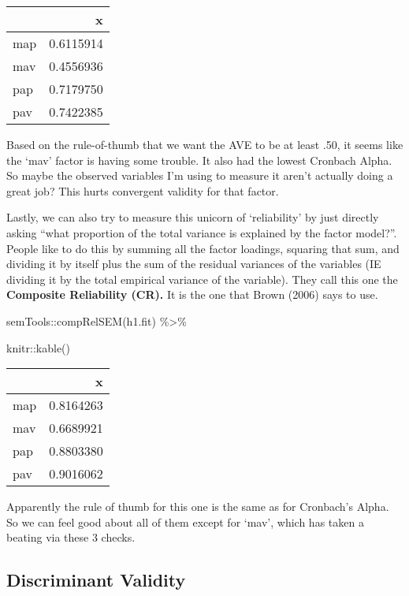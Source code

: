 \documentclass[
  letterpaper,
  DIV=11,
  numbers=noendperiod]{scrreprt}
\newenvironment{Shaded}{\begin{snugshade}}{\end{snugshade}}
\newcommand{\FunctionTok}[1]{\textcolor[rgb]{0.28,0.35,0.67}{#1}}
\newcommand{\NormalTok}[1]{\textcolor[rgb]{0.00,0.23,0.31}{#1}}
\newcommand{\SpecialCharTok}[1]{\textcolor[rgb]{0.37,0.37,0.37}{#1}}
\begin{document}
\begin{longtable}[]{@{}lr@{}}
\toprule()
& x \\
\midrule()
\endhead
map & 0.6115914 \\
mav & 0.4556936 \\
pap & 0.7179750 \\
pav & 0.7422385 \\
\bottomrule()
\end{longtable}

Based on the rule-of-thumb that we want the AVE to be at least .50, it
seems like the `mav' factor is having some trouble. It also had the
lowest Cronbach Alpha. So maybe the observed variables I'm using to
measure it aren't actually doing a great job? This hurts convergent
validity for that factor.

Lastly, we can also try to measure this unicorn of `reliability' by just
directly asking ``what proportion of the total variance is explained by
the factor model?''. People like to do this by summing all the factor
loadings, squaring that sum, and dividing it by itself plus the sum of
the residual variances of the variables (IE dividing it by the total
empirical variance of the variable). They call this one the
\textbf{Composite Reliability (CR).} It is the one that Brown (2006)
says to use.

\begin{Shaded}
\begin{Highlighting}[]
\NormalTok{semTools}\SpecialCharTok{::}\FunctionTok{compRelSEM}\NormalTok{(h1.fit) }\SpecialCharTok{\%\textgreater{}\%} 
  
\NormalTok{  knitr}\SpecialCharTok{::}\FunctionTok{kable}\NormalTok{()}
\end{Highlighting}
\end{Shaded}

\begin{longtable}[]{@{}lr@{}}
\toprule()
& x \\
\midrule()
\endhead
map & 0.8164263 \\
mav & 0.6689921 \\
pap & 0.8803380 \\
pav & 0.9016062 \\
\bottomrule()
\end{longtable}

Apparently the rule of thumb for this one is the same as for Cronbach's
Alpha. So we can feel good about all of them except for `mav', which has
taken a beating via these 3 checks.

\hypertarget{discriminant-validity}{%
\subsection*{Discriminant Validity}\label{discriminant-validity}}
\end{document}
